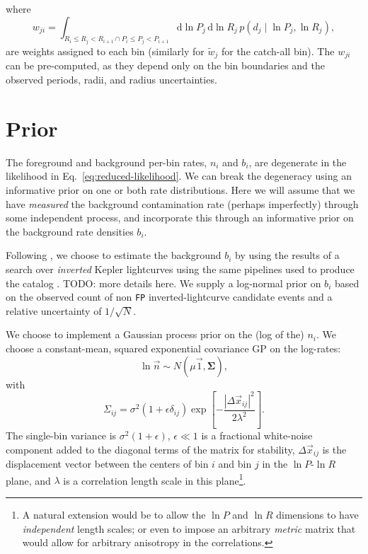 \documentclass[modern]{aastex62}
\newcommand{\dd}{\mathrm{d}}
\begin{document}
%
where
%
\begin{equation}
  w_{ji} = \int_{R_i \leq R_j < R_{i+1} \cap P_i \leq P_j < P_{i+1}} \dd \ln P_j \, \dd \ln R_j \, p\left( d_j \mid \ln P_j, \ln R_j \right),
\end{equation}
%
are weights assigned to each bin (similarly for $\tilde{w}_j$ for the catch-all
bin).  The $w_{ji}$ can be pre-computed, as they depend only on the bin
boundaries and the observed periods, radii, and radius uncertainties.

\section{Prior}

The foreground and background per-bin rates, $n_i$ and $b_i$, are degenerate in
the likelihood in Eq.\ \eqref{eq:reduced-likelihood}.  We can break the
degeneracy using an informative prior on one or both rate distributions.  Here
we will assume that we have \emph{measured} the background contamination rate
(perhaps imperfectly) through some independent process, and incorporate this
through an informative prior on the background rate densities $b_i$.

Following \citet{Formean-Mackey2014}, we choose to estimate the background $b_i$
by using the results of a search over \emph{inverted} Kepler lightcurves using
the same pipelines used to produce the catalog \citep{Coughlin2017}.  TODO: more
details here.  We supply a log-normal prior on $b_i$ based on the observed count
of non \texttt{FP} inverted-lightcurve candidate events and a relative
uncertainty of $1/\sqrt{N}$.

We choose to implement a Gaussian process prior on the (log of the) $n_i$.  We
choose a constant-mean, squared exponential covariance GP on the log-rates:
%
\begin{equation}
  \ln \vec{n} \sim N\left( \mu \vec{1} , \mathbf{\Sigma} \right),
\end{equation}
%
with
%
\begin{equation}
  \Sigma_{ij} = \sigma^2 \left( 1 + \epsilon \delta_{ij} \right) \exp\left[ -\frac{\left| \Delta \vec{x}_{ij} \right|^2}{2 \lambda^2} \right].
\end{equation}
%
The single-bin variance is $\sigma^2 \left( 1 + \epsilon \right)$, $\epsilon \ll
1$ is a fractional white-noise component added to the diagonal terms of the
matrix for stability, $\Delta \vec{x}_{ij}$ is the displacement vector between
the centers of bin $i$ and bin $j$ in the $\ln P$-$\ln R$ plane, and $\lambda$
is a correlation length scale in this plane\footnote{A natural extension would
be to allow the $\ln P$ and $\ln R$ dimensions to have \emph{independent} length
scales; or even to impose an arbitrary \emph{metric} matrix that would allow for
arbitrary anisotropy in the correlations.}.


\end{document}
